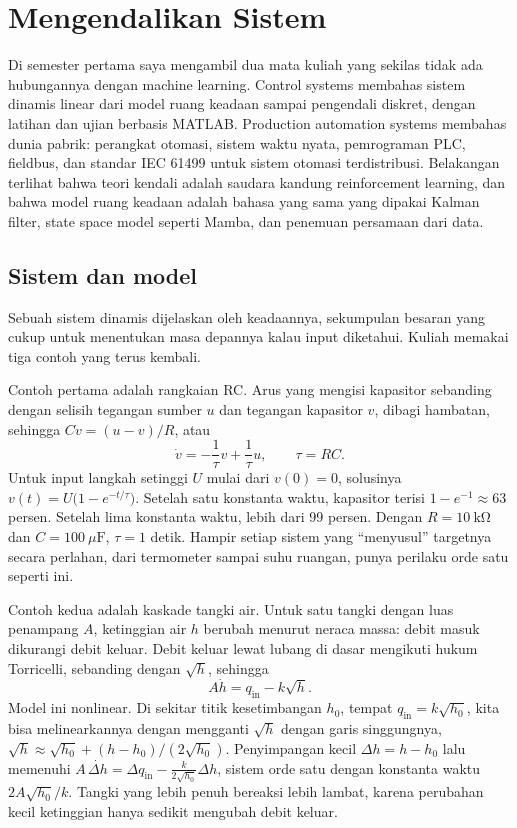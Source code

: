 \chapter{Mengendalikan Sistem}
\label{ch:kendali}

Di semester pertama saya mengambil dua mata kuliah yang sekilas tidak ada hubungannya dengan machine
learning. Control systems membahas sistem dinamis linear dari model ruang keadaan sampai pengendali
diskret, dengan latihan dan ujian berbasis MATLAB. Production automation systems membahas dunia pabrik:
perangkat otomasi, sistem waktu nyata, pemrograman PLC, fieldbus, dan standar IEC 61499 untuk sistem
otomasi terdistribusi. Belakangan terlihat bahwa teori kendali adalah saudara kandung reinforcement
learning, dan bahwa model ruang keadaan adalah bahasa yang sama yang dipakai Kalman filter, state space
model seperti Mamba, dan penemuan persamaan dari data.

\section{Sistem dan model}

Sebuah sistem dinamis dijelaskan oleh keadaannya, sekumpulan besaran yang cukup untuk menentukan masa
depannya kalau input diketahui. Kuliah memakai tiga contoh yang terus kembali.

Contoh pertama adalah rangkaian RC. Arus yang mengisi kapasitor sebanding dengan selisih tegangan sumber
$u$ dan tegangan kapasitor $v$, dibagi hambatan, sehingga $C\dot v=(u-v)/R$, atau
\begin{equation}
\dot v=-\frac1\tau v+\frac1\tau u,\qquad\tau=RC.
\end{equation}
Untuk input langkah setinggi $U$ mulai dari $v(0)=0$, solusinya $v(t)=U\big(1-e^{-t/\tau}\big)$. Setelah satu
konstanta waktu, kapasitor terisi $1-e^{-1}\approx63$ persen. Setelah lima konstanta waktu, lebih dari 99
persen. Dengan $R=10\ \mathrm{k\Omega}$ dan $C=100\ \mu\mathrm F$, $\tau=1$ detik. Hampir setiap sistem yang
``menyusul'' targetnya secara perlahan, dari termometer sampai suhu ruangan, punya perilaku orde satu seperti
ini.

Contoh kedua adalah kaskade tangki air. Untuk satu tangki dengan luas penampang $A$, ketinggian air $h$
berubah menurut neraca massa: debit masuk dikurangi debit keluar. Debit keluar lewat lubang di dasar
mengikuti hukum Torricelli, sebanding dengan $\sqrt h$, sehingga
\begin{equation}
A\dot h=q_{\mathrm{in}}-k\sqrt h.
\end{equation}
Model ini nonlinear. Di sekitar titik kesetimbangan $h_0$, tempat $q_{\mathrm{in}}=k\sqrt{h_0}$, kita bisa
melinearkannya dengan mengganti $\sqrt h$ dengan garis singgungnya,
$\sqrt h\approx\sqrt{h_0}+(h-h_0)/(2\sqrt{h_0})$. Penyimpangan kecil $\Delta h=h-h_0$ lalu memenuhi
$A\,\dot{\Delta h}=\Delta q_{\mathrm{in}}-\frac{k}{2\sqrt{h_0}}\Delta h$, sistem orde satu dengan konstanta waktu
$2A\sqrt{h_0}/k$. Tangki yang lebih penuh bereaksi lebih lambat, karena perubahan kecil ketinggian hanya
sedikit mengubah debit keluar.

